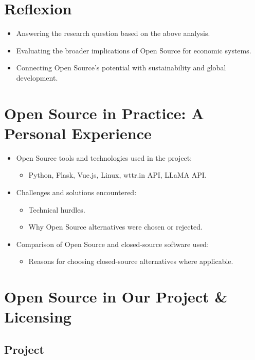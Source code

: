 \section{Reflexion}

\begin{itemize}
    \item Answering the research question based on the above analysis.
    \item Evaluating the broader implications of Open Source for economic systems.
    \item Connecting Open Source's potential with sustainability and global development.
\end{itemize}

\section{Open Source in Practice: A Personal Experience}

\begin{itemize}
    \item Open Source tools and technologies used in the project:
    \begin{itemize}
        \item Python, Flask, Vue.js, Linux, wttr.in API, LLaMA API.
    \end{itemize}
    \item Challenges and solutions encountered:
    \begin{itemize}
        \item Technical hurdles.
        \item Why Open Source alternatives were chosen or rejected.
    \end{itemize}
    \item Comparison of Open Source and closed-source software used:
    \begin{itemize}
        \item Reasons for choosing closed-source alternatives where applicable.
    \end{itemize}
\end{itemize}

\section{Open Source in Our Project \& Licensing}
\subsection{Project}

